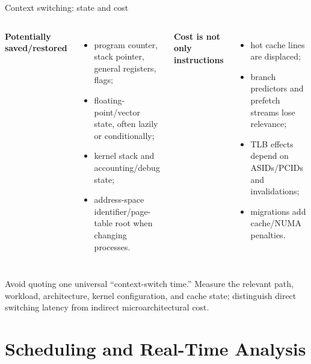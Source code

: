 \documentclass[aspectratio=169,11pt]{beamer}
\begin{document}
\begin{frame}{Context switching: state and cost}
  \begin{columns}[T,onlytextwidth]
      \textbf{Potentially saved/restored}
      \begin{itemize}
        \item program counter, stack pointer, general registers, flags;
        \item floating-point/vector state, often lazily or conditionally;
        \item kernel stack and accounting/debug state;
        \item address-space identifier/page-table root when changing processes.
      \end{itemize}
      \textbf{Cost is not only instructions}
      \begin{itemize}
        \item hot cache lines are displaced;
        \item branch predictors and prefetch streams lose relevance;
        \item TLB effects depend on ASIDs/PCIDs and invalidations;
        \item migrations add cache/NUMA penalties.
      \end{itemize}
  \end{columns}
  \begin{tcolorbox}[title=Measurement rule]
    Avoid quoting one universal ``context-switch time.'' Measure the relevant path, workload, architecture, kernel configuration, and cache state; distinguish direct switching latency from indirect microarchitectural cost.
  \end{tcolorbox}
\end{frame}

\section{Scheduling and Real-Time Analysis}
\end{document}
